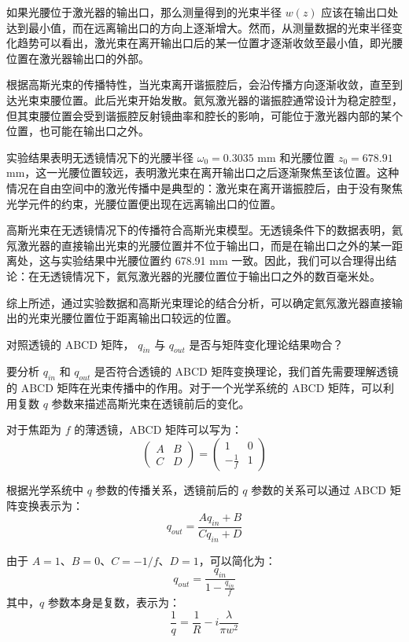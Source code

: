 如果光腰位于激光器的输出口，那么测量得到的光束半径 \( w(z) \) 应该在输出口处达到最小值，而在远离输出口的方向上逐渐增大。然而，从测量数据的光束半径变化趋势可以看出，激光束在离开输出口后的某一位置才逐渐收敛至最小值，即光腰位置在激光器输出口的外部。

根据高斯光束的传播特性，当光束离开谐振腔后，会沿传播方向逐渐收敛，直至到达光束束腰位置。此后光束开始发散。氦氖激光器的谐振腔通常设计为稳定腔型，但其束腰位置会受到谐振腔反射镜曲率和腔长的影响，可能位于激光器内部的某个位置，也可能在输出口之外。

实验结果表明无透镜情况下的光腰半径 \( \omega_0 = 0.3035 \) mm 和光腰位置 \( z_0 = 678.91 \) mm，这一光腰位置较远，表明激光束在离开输出口之后逐渐聚焦至该位置。这种情况在自由空间中的激光传播中是典型的：激光束在离开谐振腔后，由于没有聚焦光学元件的约束，光腰位置便出现在远离输出口的位置。

高斯光束在无透镜情况下的传播符合高斯光束模型。无透镜条件下的数据表明，氦氖激光器的直接输出光束的光腰位置并不位于输出口，而是在输出口之外的某一距离处，这与实验结果中光腰位置约 678.91 mm 一致。因此，我们可以合理得出结论：在无透镜情况下，氦氖激光器的光腰位置位于输出口之外的数百毫米处。

综上所述，通过实验数据和高斯光束理论的结合分析，可以确定氦氖激光器直接输出的光束光腰位置位于距离输出口较远的位置。


\begin{question}
	对照透镜的 ABCD 矩阵， $q_{in}$ 与 $q_{out}$ 是否与矩阵变化理论结果吻合？
\end{question}
要分析 \( q_{in} \) 和 \( q_{out} \) 是否符合透镜的 ABCD 矩阵变换理论，我们首先需要理解透镜的 ABCD 矩阵在光束传播中的作用。对于一个光学系统的 ABCD 矩阵，可以利用复数 \( q \) 参数来描述高斯光束在透镜前后的变化。

对于焦距为 \( f \) 的薄透镜，ABCD 矩阵可以写为：
\[
\begin{pmatrix}
	A & B \\
	C & D
\end{pmatrix}
= 
\begin{pmatrix}
	1 & 0 \\
	-\frac{1}{f} & 1
\end{pmatrix}
\]

根据光学系统中 \( q \) 参数的传播关系，透镜前后的 \( q \) 参数的关系可以通过 ABCD 矩阵变换表示为：
\[
q_{out} = \frac{A q_{in} + B}{C q_{in} + D}
\]

由于 \( A = 1 \)、\( B = 0 \)、\( C = -1/f \)、\( D = 1 \)，可以简化为：
\[
q_{out} = \frac{q_{in}}{1 - \frac{q_{in}}{f}}
\]
其中，\( q \) 参数本身是复数，表示为：
\[
\frac{1}{q} = \frac{1}{R} - i\frac{\lambda}{\pi w^2}
\]

